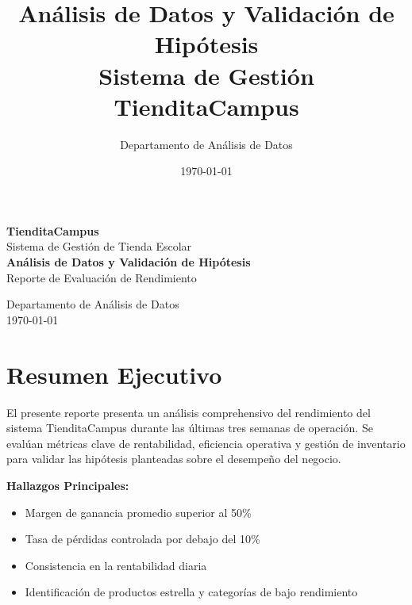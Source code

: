 \documentclass[12pt,a4paper]{article}
\title{\textbf{Análisis de Datos y Validación de Hipótesis}\\
\large Sistema de Gestión TienditaCampus}
\author{Departamento de Análisis de Datos}
\date{\today}
\begin{document}
\begin{titlepage}
    \centering
    \vspace*{2cm}
    
    {\Huge \textbf{TienditaCampus}}\\[0.5cm]
    {\Large Sistema de Gestión de Tienda Escolar}\\[1cm]
    
    {\huge \textbf{Análisis de Datos y Validación de Hipótesis}}\\[0.5cm]
    {\Large Reporte de Evaluación de Rendimiento}\\[2cm]
    
    
    \vfill
    
    {\large Departamento de Análisis de Datos}\\[0.3cm]
    {\large \today}
    
\end{titlepage}

\tableofcontents
\newpage

\section{Resumen Ejecutivo}
El presente reporte presenta un análisis comprehensivo del rendimiento del sistema TienditaCampus durante las últimas tres semanas de operación. Se evalúan métricas clave de rentabilidad, eficiencia operativa y gestión de inventario para validar las hipótesis planteadas sobre el desempeño del negocio.

\textbf{Hallazgos Principales:}
\begin{itemize}
    \item Margen de ganancia promedio superior al 50\%
    \item Tasa de pérdidas controlada por debajo del 10\%
    \item Consistencia en la rentabilidad diaria
    \item Identificación de productos estrella y categorías de bajo rendimiento
\end{itemize}
\end{document}
